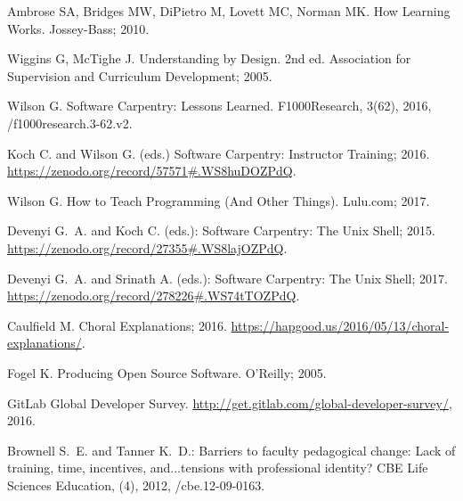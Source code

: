 \documentclass[10pt,letterpaper]{article}
\begin{document}
\begin{thebibliography}{1}

Ambrose SA, Bridges MW, DiPietro M, Lovett MC, Norman MK.
\newblock How Learning Works.
\newblock Jossey-Bass; 2010.

Wiggins G, McTighe J.
\newblock Understanding by Design.
\newblock 2nd ed. Association for Supervision and Curriculum Development; 2005.

Wilson G.
\newblock Software Carpentry: Lessons Learned.
\newblock F1000Research, 3(62), 2016,
/f1000research.3-62.v2.

Koch C. and Wilson G. (eds.)
\newblock Software Carpentry: Instructor Training; 2016.
\newblock \url{https://zenodo.org/record/57571#.WS8huDOZPdQ}.

Wilson G.
\newblock How to Teach Programming (And Other Things).
\newblock Lulu.com; 2017.

Devenyi G.~A. and Koch C. (eds.):
Software Carpentry: The Unix Shell; 2015.
\newblock \url{https://zenodo.org/record/27355#.WS8lajOZPdQ}.

Devenyi G.~A. and Srinath A. (eds.):
Software Carpentry: The Unix Shell; 2017.
\newblock \url{https://zenodo.org/record/278226#.WS74tTOZPdQ}.

Caulfield M. Choral Explanations; 2016.
\newblock \url{https://hapgood.us/2016/05/13/choral-explanations/}.

Fogel K.
\newblock Producing Open Source Software.
\newblock O'Reilly; 2005.

GitLab
\newblock Global Developer Survey.
\newblock \url{http://get.gitlab.com/global-developer-survey/}, 2016.

Brownell S.~E. and Tanner K.~D.:
Barriers to faculty pedagogical change: Lack of training, time, incentives, and...tensions with professional identity?
\newblock CBE Life Sciences Education,
(4), 2012,
/cbe.12-09-0163.

\end{thebibliography}

\newpage
\end{document}
